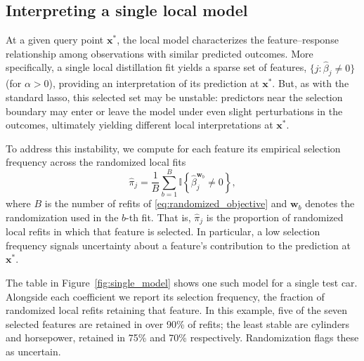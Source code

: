 \documentclass[12pt]{article}
\theoremstyle{definition}
\begin{document}
\subsection{Interpreting a single local model}
\label{sec:interpretation_singular}

At a given query point $\bm{x}^*$, the local model characterizes the feature--response relationship among observations with similar predicted outcomes.
More specifically, a single local distillation fit yields a sparse set of features, $\{j:\hat{\beta}_j\neq 0\}$ (for $\alpha > 0$), providing an interpretation of its prediction at $\bm{x}^*$.
But, as with the standard lasso, this selected set may be unstable: predictors near the selection boundary may enter or leave the model under even slight perturbations in the outcomes, ultimately yielding different local interpretations at $\bm{x}^*$. 

To address this instability, we compute for each feature its empirical selection frequency across the randomized local fits
$$
\hat{\pi}_j = \frac{1}{B}\sum_{b=1}^{B}
\mathbb{I}\left\{\hat{\beta}^{\bm{w}_b}_j \neq 0\right\},
$$
where $B$ is the number of refits of \eqref{eq:randomized_objective} and $\bm{w}_b$ denotes the randomization used in the $b$-th fit.
That is, $\hat{\pi}_j$ is the proportion of randomized local refits in which that feature is selected.
In particular, a low selection frequency signals uncertainty about a feature's contribution to the prediction at $\bm{x}^*$.

The table in Figure~\ref{fig:single_model} shows one such model for a single test car.
Alongside each coefficient we report its selection frequency, the fraction of randomized local refits retaining that feature.
In this example, five of the seven selected features are retained in over 90\% of refits; the least stable are cylinders and horsepower, retained in 75\% and 70\% respectively.
Randomization flags these as uncertain.
\end{document}
